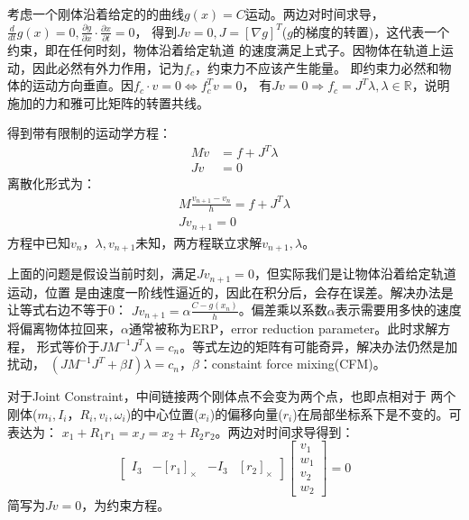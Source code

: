 \documentclass[lang=cn,newtx,10pt,scheme=chinese]{elegantbook}
\begin{document}
考虑一个刚体沿着给定的的曲线$g(x)=C$运动。两边对时间求导，$\frac{d}{d t}g(x)=0, 
\frac{\partial g}{\partial x}\cdot \frac{\partial x}{\partial t}=0$，
得到$Jv=0, J=[\nabla g ]^T$($g$的梯度的转置)，这代表一个约束，即在任何时刻，物体沿着给定轨道
的速度满足上式子。因物体在轨道上运动，因此必然有外力作用，记为$f_c$，约束力不应该产生能量。
即约束力必然和物体的运动方向垂直。因$f_c \cdot v = 0 \Longleftrightarrow f^{T}_c v = 0$，
有$J v = 0 \Rightarrow f_c = J^{T}\lambda,\lambda \in \mathbb{R}$，说明施加的力和雅可比矩阵的转置共线。

得到带有限制的运动学方程：
\begin{equation}
  \begin{aligned}
  M \dot{v} & =f+J^T \lambda \\
  J v & =0
  \end{aligned}
\end{equation}
离散化形式为：
\begin{equation}
  \begin{gathered}
  M \frac{v_{n+1}-v_n}{h}=f+J^T \lambda \\
  J v_{n+1}=0
  \end{gathered}
\end{equation}
方程中已知$v_n$，$\lambda, v_{n+1}$未知，两方程联立求解$v_{n+1}, \lambda$。

上面的问题是假设当前时刻，满足$J v_{n+1}=0$，但实际我们是让物体沿着给定轨道运动，位置
是由速度一阶线性逼近的，因此在积分后，会存在误差。解决办法是让等式右边不等于0：
$J v_{n+1}=\alpha \frac{C - g(x_n)}{h}$。偏差乘以系数$\alpha$表示需要用多快的速度
将偏离物体拉回来，$\alpha$通常被称为ERP，error reduction parameter。此时求解方程，
形式等价于$JM^{-1}J^T \lambda=c_n$。等式左边的矩阵有可能奇异，解决办法仍然是加扰动，
$(JM^{-1}J^T  + \beta I )\lambda=c_n$，$\beta$：constaint force mixing(CFM)。

对于Joint Constraint，中间链接两个刚体点不会变为两个点，也即点相对于
两个刚体($m_i,I_i，R_i,v_i,\omega_i$)的中心位置($x_i$)的偏移向量($r_i$)在局部坐标系下是不变的。可表达为：
$x_1 + R_1 r_1 = x_J = x_2 + R_2 r_2$。两边对时间求导得到：
\begin{equation}
  \left[\begin{array}{llll}
  I_3 & -\left[r_1\right]_{\times} & -I_3 & {\left[r_2\right]_{\times}}
  \end{array}\right]\left[\begin{array}{l}
  v_1 \\
  w_1 \\
  v_2 \\
  w_2
  \end{array}\right]=0
  \end{equation}
简写为$J v=0$，为约束方程。
\end{document}
